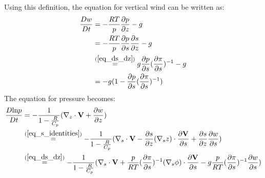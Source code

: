 Using this definition, the equation for vertical wind can be written as:
\begin{align*}
\frac{Dw}{Dt} &= - \frac{RT}{p} \frac{\partial p}{\partial z} - g\\
&= - \frac{RT}{p} \frac{\partial p}{\partial s}\frac{\partial s}{\partial z} - g\\
&\stackrel{(\ref{eq_ds_dz})}{=} g \frac{\partial p}{\partial s}(\frac{\partial \pi}{\partial s})^{-1} - g\\
&= -g(1 - \frac{\partial p}{\partial s}(\frac{\partial \pi}{\partial s})^{-1})
\end{align*}
The equation for pressure becomes:
\begin{align*}
\frac{D\text{ln}p}{Dt} &= -\frac{1}{1- \frac{R}{C_p}} (\nabla_z \cdot \textbf{V} + \frac{\partial w}{\partial z})\\
&\stackrel{(\ref{eq_s_identities})}{=} -\frac{1}{1- \frac{R}{C_p}} (\nabla _s \cdot \textbf{V} - \frac{\partial s}{\partial z} (\nabla _sz)\cdot \frac{\partial \textbf{V}}{\partial s} + \frac{\partial s}{\partial z}\frac{\partial w}{\partial s})\\
&\stackrel{(\ref{eq_ds_dz})}{=} -\frac{1}{1- \frac{R}{C_p}} (\nabla _s \cdot \textbf{V} + \frac{p}{RT}(\frac{\partial \pi}{\partial s})^{-1} (\nabla _s \phi)\cdot\frac{\partial \textbf{V}}{\partial s} - g\frac{p}{RT}(\frac{\partial \pi}{\partial s})^{-1} \frac{\partial w}{\partial s})\\
\end{align*}

